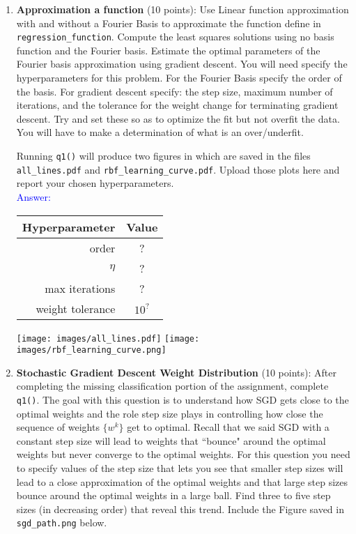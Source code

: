 \documentclass{article}
\begin{document}
\begin{enumerate}
    \newpage
    \item \textbf{Approximation a function} (10 points): Use Linear function approximation with and without a Fourier Basis to approximate the function define in \texttt{regression\_function}. Compute the least squares solutions using no basis function and the Fourier basis. Estimate the optimal parameters of the Fourier basis approximation using gradient descent. You will need specify the hyperparameters for this problem. For the Fourier Basis specify the order of the basis. For gradient descent specify: the step size, maximum number of iterations, and the tolerance for the weight change for terminating gradient descent. Try and set these so as to optimize the fit but not overfit the data. You will have to make a determination of what is an over/underfit. 

    Running \texttt{q1()} will produce two figures in which are saved in the files \texttt{all\_lines.pdf} and \texttt{rbf\_learning\_curve.pdf}. Upload those plots here and report your chosen hyperparameters. 
    \\
    \textcolor{blue}{Answer: }\\
        \begin{table}[htbp]
        \centering
        \begin{tabular}{rc}
        \multicolumn{1}{c}{Hyperparameter} & \multicolumn{1}{c}{Value} \\ \hline
        order               &     ?                \\
        $\eta$              &     ?               \\
        max iterations      &     ?               \\
        weight tolerance    &    $10^?$           \\ \hline
        \end{tabular}
        \end{table}
        \texttt{[image: images/all\_lines.pdf]}
        \texttt{[image: images/rbf\_learning\_curve.png]}

    \newpage
    \item \textbf{Stochastic Gradient Descent Weight Distribution} (10 points): After completing the missing classification portion of the assignment, complete \texttt{q1()}. The goal with this question is to understand how SGD gets close to the optimal weights and the role step size plays in controlling how close the sequence of weights $\{w^k\}$ get to optimal. Recall that we said SGD with a constant step size will lead to weights that ``bounce" around the optimal weights but never converge to the optimal weights. For this question you need to specify values of the step size that lets you see that smaller step sizes will lead to a close approximation of the optimal weights and that large step sizes bounce around the optimal weights in a large ball. Find three to five step sizes (in decreasing order) that reveal this trend. Include the Figure saved in \texttt{sgd\_path.png} below. 


\end{enumerate}
\end{document}
